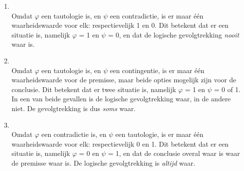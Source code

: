 \begin{answer}
\begin{enumerate}[label=\textit{\alph*.}]
\item{}\\
    Omdat $\varphi$ een tautologie is, en $\psi$ een contradictie, is er maar \'{e}\'{e}n waarheidswaarde voor elk: respectievelijk 1 en 0. Dit betekent dat er een situatie is, namelijk $\varphi$ = 1 en $\psi$ = 0, en dat de logische gevolgtrekking \emph{nooit} waar is.

\item{}\\
    Omdat $\varphi$ een tautologie is, en $\psi$ een contingentie, is er maar \'{e}\'{e}n waarheidswaarde voor de premisse, maar beide opties mogelijk zijn voor de conclusie. Dit betekent dat er twee situatie is, namelijk $\varphi$ = 1 en $\psi$ = 0 of 1. In een van beide gevallen is de logische gevolgtrekking waar, in de andere niet. De gevolgtrekking is dus \emph{soms} waar.

\item{}\\
    Omdat $\varphi$ een contradictie is, en $\psi$ een tautologie, is er maar \'{e}\'{e}n waarheidswaarde voor elk: respectievelijk 0 en 1. Dit betekent dat er een situatie is, namelijk $\varphi$ = 0 en $\psi$ = 1, en dat de conclusie overal waar is waar de premisse waar is. De logische gevolgtrekking is \emph{altijd} waar.


\end{enumerate}
\end{answer}
